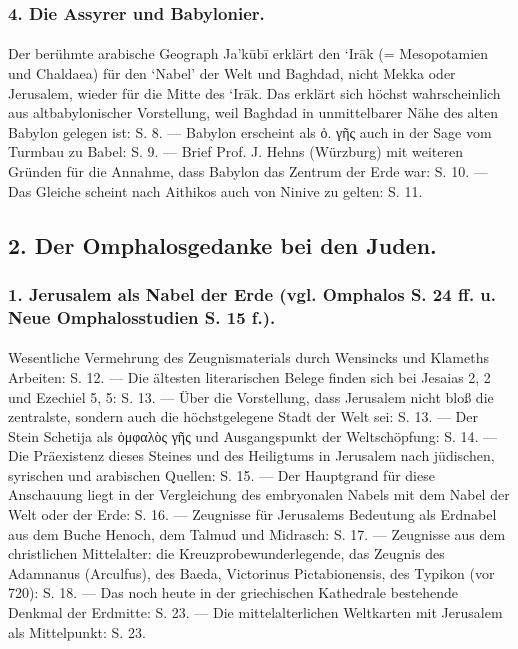 \documentclass[a4paper, 11pt, oneside]{article}
\begin{document}
\subsubsection*{4. Die Assyrer und Babylonier.}
\paragraph{}
Der berühmte arabische Geograph Ja'kūbī erklärt den `Irāk (= Mesopotamien und Chaldaea) für den `Nabel' der Welt und Baghdad, nicht Mekka oder Jerusalem, wieder für die Mitte des `Irāk. Das erklärt sich höchst wahrscheinlich aus altbabylonischer Vorstellung, weil Baghdad in unmittelbarer Nähe des alten Babylon gelegen ist: S. 8. --- Babylon erscheint als ὀ. γῆς auch in der Sage vom Turmbau zu Babel: S. 9. --- Brief Prof. J. Hehns (Würzburg) mit weiteren Gründen für die Annahme, dass Babylon das Zentrum der Erde war: S. 10. --- Das Gleiche scheint nach Aithikos auch von Ninive zu gelten: S. 11.

\subsection*{2. Der Omphalosgedanke bei den Juden.}
\subsubsection*{1. Jerusalem als Nabel der Erde (vgl. Omphalos S. 24 ff. u. Neue Omphalosstudien S. 15 f.).}
\paragraph{}
Wesentliche Vermehrung des Zeugnismaterials durch Wensincks und Klameths Arbeiten: S. 12. --- Die ältesten literarischen Belege finden sich bei Jesaias 2, 2 und Ezechiel 5, 5: S. 13. --- Über die Vorstellung, dass Jerusalem nicht bloß die zentralste, sondern auch die höchstgelegene Stadt der Welt sei: S. 13. --- Der Stein Schetija als ὀμφαλὸς γῆς und Ausgangspunkt der Weltschöpfung: S. 14. --- Die Präexistenz dieses Steines und des Heiligtums in Jerusalem nach jüdischen, syrischen und arabischen Quellen: S. 15. --- Der Hauptgrand für diese Anschauung liegt in der Vergleichung des embryonalen Nabels mit dem Nabel der Welt oder der Erde: S. 16. --- Zeugnisse für Jerusalems Bedeutung als Erdnabel aus dem Buche Henoch, dem Talmud und Midrasch: S. 17. --- Zeugnisse aus dem christlichen Mittelalter: die Kreuzprobewunderlegende, das Zeugnis des Adamnanus (Arculfus), des Baeda, Victorinus Pictabionensis, des Typikon (vor 720): S. 18. --- Das noch heute in der griechischen Kathedrale bestehende Denkmal der Erdmitte: S. 23. --- Die mittelalterlichen Weltkarten mit Jerusalem als Mittelpunkt: S. 23.
\end{document}
